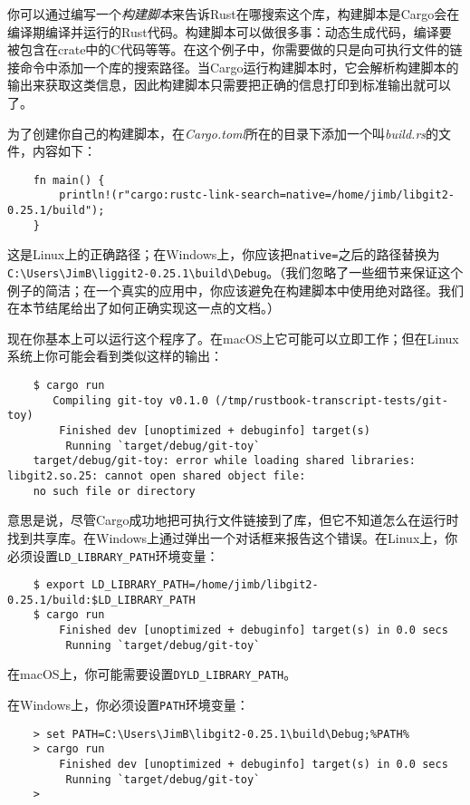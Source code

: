 你可以通过编写一个\emph{构建脚本}来告诉Rust在哪搜索这个库，构建脚本是Cargo会在编译期编译并运行的Rust代码。构建脚本可以做很多事：动态生成代码，编译要被包含在crate中的C代码等等。在这个例子中，你需要做的只是向可执行文件的链接命令中添加一个库的搜索路径。当Cargo运行构建脚本时，它会解析构建脚本的输出来获取这类信息，因此构建脚本只需要把正确的信息打印到标准输出就可以了。

为了创建你自己的构建脚本，在\emph{Cargo.toml}所在的目录下添加一个叫\emph{build.rs}的文件，内容如下：
\begin{verbatim}
    fn main() {
        println!(r"cargo:rustc-link-search=native=/home/jimb/libgit2-0.25.1/build");
    }
\end{verbatim}

这是Linux上的正确路径；在Windows上，你应该把\texttt{native=}之后的路径替换为\texttt{C:\textbackslash{}Users\textbackslash{}JimB\textbackslash{}liggit2-0.25.1\textbackslash{}build\textbackslash{}Debug}。（我们忽略了一些细节来保证这个例子的简洁；在一个真实的应用中，你应该避免在构建脚本中使用绝对路径。我们在本节结尾给出了如何正确实现这一点的文档。）

现在你基本上可以运行这个程序了。在macOS上它可能可以立即工作；但在Linux系统上你可能会看到类似这样的输出：
\begin{verbatim}
    $ cargo run
       Compiling git-toy v0.1.0 (/tmp/rustbook-transcript-tests/git-toy)
        Finished dev [unoptimized + debuginfo] target(s)
         Running `target/debug/git-toy`
    target/debug/git-toy: error while loading shared libraries: libgit2.so.25: cannot open shared object file:
    no such file or directory
\end{verbatim}

意思是说，尽管Cargo成功地把可执行文件链接到了库，但它不知道怎么在运行时找到共享库。在Windows上通过弹出一个对话框来报告这个错误。在Linux上，你必须设置\texttt{LD\_LIBRARY\_PATH}环境变量：
\begin{verbatim}
    $ export LD_LIBRARY_PATH=/home/jimb/libgit2-0.25.1/build:$LD_LIBRARY_PATH
    $ cargo run
        Finished dev [unoptimized + debuginfo] target(s) in 0.0 secs
         Running `target/debug/git-toy`
\end{verbatim}

在macOS上，你可能需要设置\texttt{DYLD\_LIBRARY\_PATH}。

在Windows上，你必须设置\texttt{PATH}环境变量：
\begin{verbatim}
    > set PATH=C:\Users\JimB\libgit2-0.25.1\build\Debug;%PATH%
    > cargo run
        Finished dev [unoptimized + debuginfo] target(s) in 0.0 secs
         Running `target/debug/git-toy`
    >
\end{verbatim}

